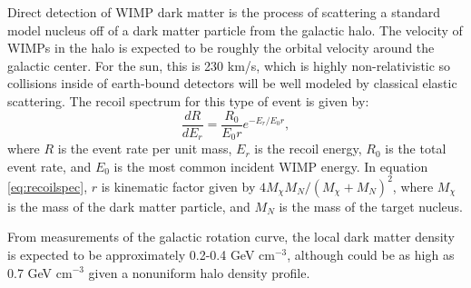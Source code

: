 Direct detection of WIMP dark matter is the process of scattering a standard model nucleus off of a dark matter particle from the galactic halo. The velocity of WIMPs in the halo is expected to be roughly the orbital velocity around the galactic center. For the sun, this is 230 km/s, which is highly non-relativistic so collisions inside of earth-bound detectors will be well modeled by classical elastic scattering. The recoil spectrum for this type of event is given by:
\begin{equation} \label{eq:recoilspec}
\frac{dR}{dE_{r}}=\frac{R_{0}}{E_{0}r}e^{-E_{r}/E_{0}r},
\end{equation}
where $R$ is the event rate per unit mass, $E_{r}$ is the recoil energy, $R_{0}$ is the total event rate, and $E_{0}$ is the most common incident WIMP energy. In equation \ref{eq:recoilspec}, $r$ is  kinematic factor given by $4M_{\chi}M_{N}/(M_{\chi}+M_{N})^2$, where $M_{\chi}$ is the mass of the dark matter particle, and $M_{N}$ is the mass of the target nucleus. 

From measurements of the galactic rotation curve, the local dark matter density is expected to be approximately 0.2-0.4 GeV cm$^{-3}$, although could be as high as 0.7 GeV cm$^{-3}$ given a nonuniform halo density profile\cite{weber}. 


